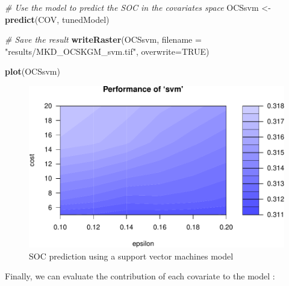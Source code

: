 \documentclass[10pt,b5paper,]{book}
\newenvironment{Shaded}{\begin{snugshade}}{\end{snugshade}}
\newcommand{\CommentTok}[1]{\textcolor[rgb]{0.56,0.35,0.01}{\textit{#1}}}
\newcommand{\ControlFlowTok}[1]{\textcolor[rgb]{0.13,0.29,0.53}{\textbf{#1}}}
\newcommand{\DataTypeTok}[1]{\textcolor[rgb]{0.13,0.29,0.53}{#1}}
\newcommand{\DecValTok}[1]{\textcolor[rgb]{0.00,0.00,0.81}{#1}}
\newcommand{\KeywordTok}[1]{\textcolor[rgb]{0.13,0.29,0.53}{\textbf{#1}}}
\newcommand{\NormalTok}[1]{#1}
\newcommand{\OperatorTok}[1]{\textcolor[rgb]{0.81,0.36,0.00}{\textbf{#1}}}
\newcommand{\OtherTok}[1]{\textcolor[rgb]{0.56,0.35,0.01}{#1}}
\newcommand{\StringTok}[1]{\textcolor[rgb]{0.31,0.60,0.02}{#1}}
\theoremstyle{definition}
\theoremstyle{definition}
\theoremstyle{definition}
\theoremstyle{remark}
\begin{document}
\begin{Shaded}
\begin{Highlighting}[]
\CommentTok{# Use the model to predict the SOC in the covariates space}
\NormalTok{OCSsvm <-}\StringTok{ }\KeywordTok{predict}\NormalTok{(COV, tunedModel)}

\CommentTok{# Save the result}
\KeywordTok{writeRaster}\NormalTok{(OCSsvm, }\DataTypeTok{filename =} \StringTok{"results/MKD_OCSKGM_svm.tif"}\NormalTok{,}
            \DataTypeTok{overwrite=}\OtherTok{TRUE}\NormalTok{)}

\KeywordTok{plot}\NormalTok{(OCSsvm)}
\end{Highlighting}
\end{Shaded}

\begin{figure}
\centering
\includegraphics{SOCMapping_files/figure-latex/unnamed-chunk-82-1.pdf}
\caption{\label{fig:unnamed-chunk-82}SOC prediction using a support vector
machines model}
\end{figure}

Finally, we can evaluate the contribution of each covariate to the model
\citep{guyon2003introduction}:

\begin{Shaded}
\end{Shaded}
\end{document}
